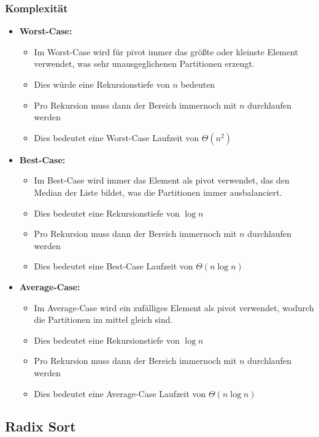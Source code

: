 \documentclass[
../AuD-Zusammenfassung.tex,
]
{subfiles}
\begin{document}
\subsubsection{Komplexität}
\begin{itemize}
    \item \textbf{Worst-Case:}
    \begin{itemize}
        \item Im Worst-Case wird für pivot immer das größte oder kleinste Element verwendet, was sehr unausgeglichenen Partitionen erzeugt.
        \item Dies würde eine Rekursionstiefe von $n$ bedeuten
        \item Pro Rekursion muss dann der Bereich immernoch mit $n$ durchlaufen werden
        \item Dies bedeutet eine Worst-Case Laufzeit von $\Theta(n^2)$
    \end{itemize}
    \item \textbf{Best-Case:}
    \begin{itemize}
        \item Im Best-Case wird immer das Element als pivot verwendet, das den Median der Liste bildet, was die Partitionen immer ausbalanciert.
        \item Dies bedeutet eine Rekursionstiefe von $\log n$
        \item Pro Rekursion muss dann der Bereich immernoch mit $n$ durchlaufen werden
        \item Dies bedeutet eine Best-Case Laufzeit von $\Theta(n\log n)$
    \end{itemize}
    \item \textbf{Average-Case:}
    \begin{itemize}
        \item Im Average-Case wird ein zufälliges Element als pivot verwendet, wodurch die Partitionen im mittel gleich sind.
        \item Dies bedeutet eine Rekursionstiefe von $\log n$
        \item Pro Rekursion muss dann der Bereich immernoch mit $n$ durchlaufen werden
        \item Dies bedeutet eine Average-Case Laufzeit von $\Theta(n\log n)$
    \end{itemize}
\end{itemize}

\subsection{Radix Sort}
\end{document}

